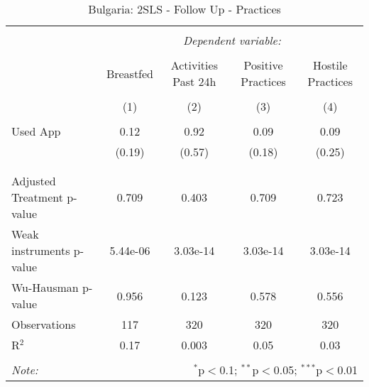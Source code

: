 
\begin{table}[!htbp] \centering 
  \caption{Bulgaria: 2SLS - Follow Up - Practices} 
  \label{tbl:Bulgaria: 2SLS - Follow Up - Practices} 
\begin{tabular}{@{\extracolsep{5pt}}lcccc} 
\\[-1.8ex]\hline 
\hline \\[-1.8ex] 
 & \multicolumn{4}{c}{\textit{Dependent variable:}} \\ 
\cline{2-5} 
\\[-1.8ex] & Breastfed & Activities Past 24h & Positive Practices & Hostile Practices \\ 
\\[-1.8ex] & (1) & (2) & (3) & (4)\\ 
\hline \\[-1.8ex] 
 Used App & 0.12 & 0.92 & 0.09 & 0.09 \\ 
  & (0.19) & (0.57) & (0.18) & (0.25) \\ 
  & & & & \\ 
\hline \\[-1.8ex] 
Adjusted Treatment p-value & 0.709 & 0.403 & 0.709 & 0.723 \\ 
Weak instruments p-value & 5.44e-06 & 3.03e-14 & 3.03e-14 & 3.03e-14 \\ 
Wu-Hausman p-value & 0.956 & 0.123 & 0.578 & 0.556 \\ 
Observations & 117 & 320 & 320 & 320 \\ 
R$^{2}$ & 0.17 & 0.003 & 0.05 & 0.03 \\ 
\hline 
\hline \\[-1.8ex] 
\textit{Note:}  & \multicolumn{4}{r}{$^{*}$p$<$0.1; $^{**}$p$<$0.05; $^{***}$p$<$0.01} \\ 
\end{tabular} 
\end{table} 
